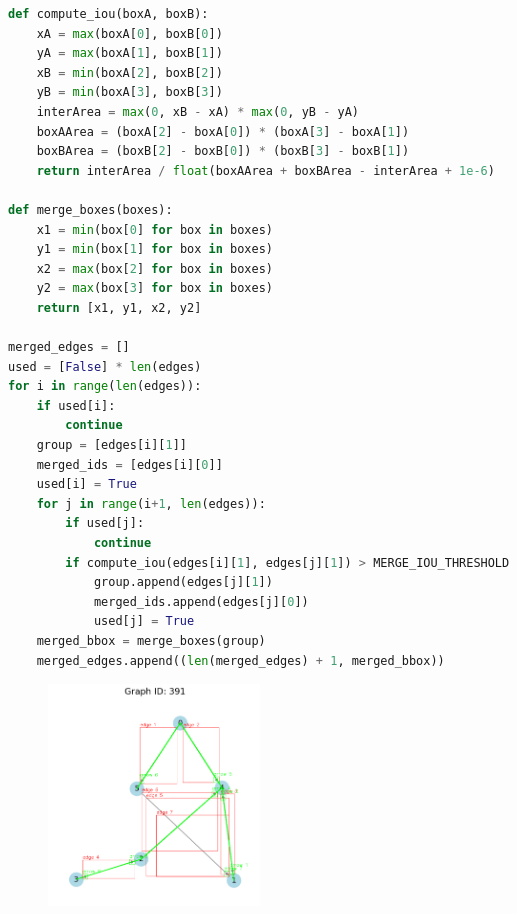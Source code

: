 \documentclass{article}
\begin{document}
\begin{lstlisting}[language=Python, caption=Algorithm to merge and complete edges]
def compute_iou(boxA, boxB):
    xA = max(boxA[0], boxB[0])
    yA = max(boxA[1], boxB[1])
    xB = min(boxA[2], boxB[2])
    yB = min(boxA[3], boxB[3])
    interArea = max(0, xB - xA) * max(0, yB - yA)
    boxAArea = (boxA[2] - boxA[0]) * (boxA[3] - boxA[1])
    boxBArea = (boxB[2] - boxB[0]) * (boxB[3] - boxB[1])
    return interArea / float(boxAArea + boxBArea - interArea + 1e-6)

def merge_boxes(boxes):
    x1 = min(box[0] for box in boxes)
    y1 = min(box[1] for box in boxes)
    x2 = max(box[2] for box in boxes)
    y2 = max(box[3] for box in boxes)
    return [x1, y1, x2, y2]

merged_edges = []
used = [False] * len(edges)
for i in range(len(edges)):
    if used[i]:
        continue
    group = [edges[i][1]]
    merged_ids = [edges[i][0]]
    used[i] = True
    for j in range(i+1, len(edges)):
        if used[j]:
            continue
        if compute_iou(edges[i][1], edges[j][1]) > MERGE_IOU_THRESHOLD:
            group.append(edges[j][1])
            merged_ids.append(edges[j][0])
            used[j] = True
    merged_bbox = merge_boxes(group)
    merged_edges.append((len(merged_edges) + 1, merged_bbox))
\end{lstlisting}

\begin{figure}[h!]
    \centering
    \includegraphics[width=0.5\textwidth]{391_before.png}
    \label{fig:example}
\end{figure}
\end{document}
